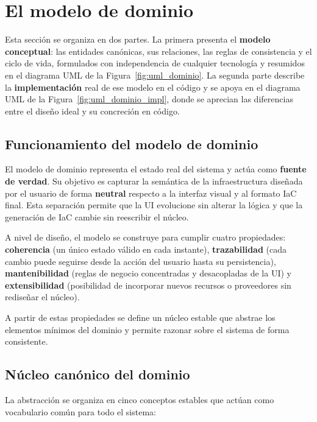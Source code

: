 \documentclass{article}
\begin{document}
    \section{El modelo de dominio}
    {
        \setlength{\parskip}{1em}
        \label{sec:modelo_dominio}
        \justify
        Esta sección se organiza en dos partes. La primera presenta el
        \textbf{modelo conceptual}: las entidades canónicas, sus relaciones, las
        reglas de consistencia y el ciclo de vida, formulados con independencia
        de cualquier tecnología y resumidos en el diagrama UML de la
        Figura~\ref{fig:uml_dominio}. La segunda parte describe la
        \textbf{implementación} real de ese modelo en el código y se apoya en el
        diagrama UML de la Figura~\ref{fig:uml_dominio_impl}, donde se aprecian
        las diferencias entre el diseño ideal y su concreción en código.

        \subsection{Funcionamiento del modelo de dominio}
        \justify
        El modelo de dominio representa el estado real del sistema y actúa como
        \textbf{fuente de verdad}. Su objetivo es capturar la semántica de la
        infraestructura diseñada por el usuario de forma \textbf{neutral} respecto a
        la interfaz visual y al formato IaC final. Esta separación permite que la UI
        evolucione sin alterar la lógica y que la generación de IaC cambie sin
        reescribir el núcleo.

        \justify
        A nivel de diseño, el modelo se construye para cumplir cuatro propiedades:
        \textbf{coherencia} (un único estado válido en cada instante), \textbf{trazabilidad}
        (cada cambio puede seguirse desde la acción del usuario hasta su persistencia),
        \textbf{mantenibilidad} (reglas de negocio concentradas y desacopladas de la UI) y
        \textbf{extensibilidad} (posibilidad de incorporar nuevos recursos o proveedores sin
        rediseñar el núcleo).

        \justify
        A partir de estas propiedades se define un núcleo estable que abstrae los elementos
        mínimos del dominio y permite razonar sobre el sistema de forma consistente.

        \subsection{Núcleo canónico del dominio}
        \justify
        La abstracción se organiza en cinco conceptos estables que actúan como vocabulario
        común para todo el sistema:

}
\end{document}
